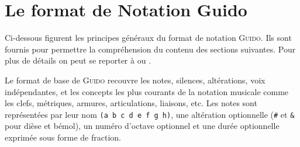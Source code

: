 \documentclass{article}
\newcommand{\guido}			{\textsc{Guido}}
\newcommand{\code}[1]		{{\small \texttt{#1}}}
\begin{document}


\section{Le format de Notation Guido}\label{sec:format_notation}

Ci-dessous figurent les principes généraux du format de notation \guido . Ils sont fournis pour permettre la compréhension du contenu des sections suivantes. Pour plus de détails on peut se reporter à \cite{Dau:09a} ou \cite{guido}.

Le format de base de \guido{} recouvre les notes, silences, altérations, voix indépendantes, et les concepts les plus courants de la notation musicale comme les clefs, métriques, armures, articulations, liaisons, etc.
Les notes sont représentées par leur nom \code{(a b c d e f g h)}, une altération optionnelle (\code{\#} et \code{\&} pour dièse et bémol), un numéro d'octave optionnel et une durée optionnelle exprimée sous forme de fraction.

\end{document}
